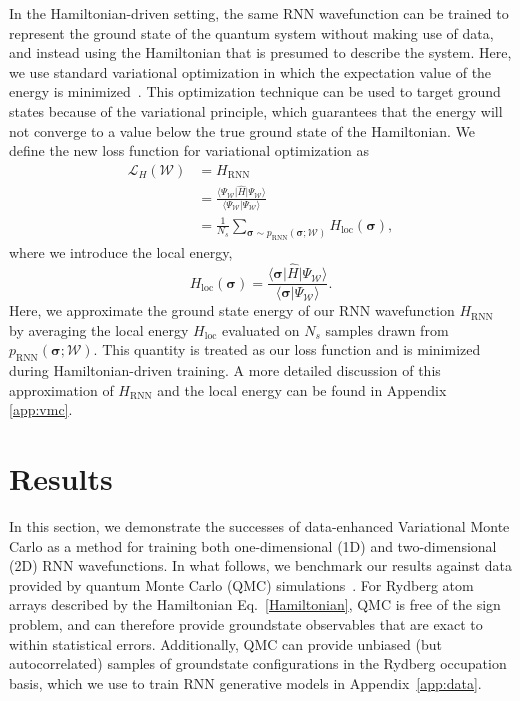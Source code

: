 \documentclass[twocolumn,
                showpacs,
                nofootinbib,
                nobibnotes,
                aps,
                superscriptaddress,
                amssymb,
                amsmath,
                floatfix,
                reprint,
                prx, 
                notitlepage,
                showkeys,
                10pt,
		]{revtex4-2}
\begin{document}
In the Hamiltonian-driven setting, the same RNN wavefunction can be trained to represent the ground state of the quantum system without making use of data, and instead using the Hamiltonian that is presumed to describe the system. Here, we use standard variational optimization in which the expectation value of the energy is minimized~\cite{becca_sorella_2017}. This optimization technique can be used to target ground states because of the variational principle, which guarantees that the energy will not converge to a value below the true ground state of the Hamiltonian. We define the new loss function for variational optimization as
\begin{align}
    \mathcal{L}_H(\mathcal{W}) &= H_{\text{RNN}} \\
    &= \frac{\langle \Psi_{\mathcal{W}}\vert \hat{H}\vert \Psi_{\mathcal{W}}\rangle}{\langle \Psi_{\mathcal{W}}\vert \Psi_{\mathcal{W}}\rangle}\\
    &= \frac{1}{N_s}\sum_{\boldsymbol\sigma \sim p_{\text{RNN}}(\boldsymbol\sigma;\mathcal{W})} H_{\text{loc}}(\boldsymbol\sigma),
\end{align}
where we introduce the local energy,
\begin{equation}
    H_{\text{loc}}(\boldsymbol\sigma) = \frac{\langle \boldsymbol\sigma\vert \hat{H}\vert \Psi_{\mathcal{W}}\rangle}{\langle \boldsymbol\sigma\vert \Psi_{\mathcal{W}}\rangle}.
\end{equation}
Here, we approximate the ground state energy of our RNN wavefunction $H_{\text{RNN}}$ by averaging the local energy $H_{\text{loc}}$ evaluated on $N_s$ samples drawn from $p_{\text{RNN}}(\boldsymbol\sigma;\mathcal{W})$. This quantity is treated as our loss function and is minimized during Hamiltonian-driven training. A more detailed discussion of this approximation of $H_{\text{RNN}}$ and the local energy can be found in Appendix \ref{app:vmc}.

%
\section{Results}
%

In this section, we demonstrate the successes of data-enhanced Variational Monte Carlo as a method for training both one-dimensional (1D) and two-dimensional (2D) RNN wavefunctions. In what follows, we benchmark our results against data provided by quantum Monte Carlo (QMC) simulations~\cite{merali2021stochastic}. For Rydberg atom arrays described by the  Hamiltonian Eq.~\eqref{Hamiltonian}, QMC is free of the sign problem, and can therefore provide groundstate observables that are exact to within statistical errors. Additionally, QMC can provide unbiased (but autocorrelated) samples of groundstate configurations in the Rydberg occupation basis, which we use to train RNN generative models in Appendix~\ref{app:data}.
\end{document}
